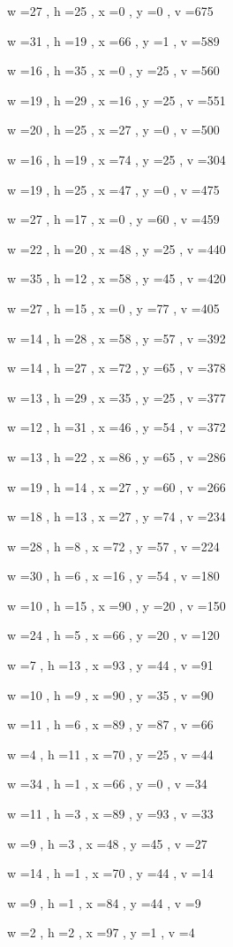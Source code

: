 \documentclass[11pt]{article}
\begin{document}
w =27 , h =25 , x =0 , y =0 , v =675
\par
w =31 , h =19 , x =66 , y =1 , v =589
\par
w =16 , h =35 , x =0 , y =25 , v =560
\par
w =19 , h =29 , x =16 , y =25 , v =551
\par
w =20 , h =25 , x =27 , y =0 , v =500
\par
w =16 , h =19 , x =74 , y =25 , v =304
\par
w =19 , h =25 , x =47 , y =0 , v =475
\par
w =27 , h =17 , x =0 , y =60 , v =459
\par
w =22 , h =20 , x =48 , y =25 , v =440
\par
w =35 , h =12 , x =58 , y =45 , v =420
\par
w =27 , h =15 , x =0 , y =77 , v =405
\par
w =14 , h =28 , x =58 , y =57 , v =392
\par
w =14 , h =27 , x =72 , y =65 , v =378
\par
w =13 , h =29 , x =35 , y =25 , v =377
\par
w =12 , h =31 , x =46 , y =54 , v =372
\par
w =13 , h =22 , x =86 , y =65 , v =286
\par
w =19 , h =14 , x =27 , y =60 , v =266
\par
w =18 , h =13 , x =27 , y =74 , v =234
\par
w =28 , h =8 , x =72 , y =57 , v =224
\par
w =30 , h =6 , x =16 , y =54 , v =180
\par
w =10 , h =15 , x =90 , y =20 , v =150
\par
w =24 , h =5 , x =66 , y =20 , v =120
\par
w =7 , h =13 , x =93 , y =44 , v =91
\par
w =10 , h =9 , x =90 , y =35 , v =90
\par
w =11 , h =6 , x =89 , y =87 , v =66
\par
w =4 , h =11 , x =70 , y =25 , v =44
\par
w =34 , h =1 , x =66 , y =0 , v =34
\par
w =11 , h =3 , x =89 , y =93 , v =33
\par
w =9 , h =3 , x =48 , y =45 , v =27
\par
w =14 , h =1 , x =70 , y =44 , v =14
\par
w =9 , h =1 , x =84 , y =44 , v =9
\par
w =2 , h =2 , x =97 , y =1 , v =4
\par
\newpage
\end{document}
